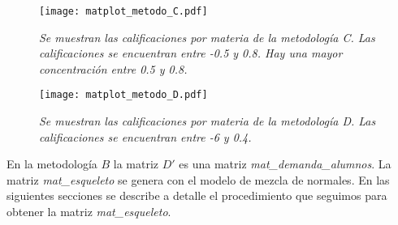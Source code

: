                                                                                                                                                                                                                                                                                                                                                                                                                                                                                   
\begin{figure}[H]
\centering
\texttt{[image: matplot\_metodo\_C.pdf]} %
\caption[\textit{Calificaciones metodología C}]{\textit{Se muestran las calificaciones por materia de la metodología C. Las calificaciones se encuentran entre -0.5 y 0.8. Hay una mayor concentración entre 0.5 y 0.8.}}\label{fig_metodo_C}
\end{figure}                                                                                                                                                                                                                                                                                                                                                                                                                                                                                  

\begin{figure}[H]
\centering
\texttt{[image: matplot\_metodo\_D.pdf]} %
\caption[\textit{Calificaciones metodología D}]{\textit{Se muestran las calificaciones por materia de la metodología D. Las calificaciones se encuentran entre -6 y 0.4.}}\label{fig_metodo_D}
\end{figure}
                                                                                                                                                                                                                                                                                                                                                                                                                                                                                  
                                                                                                                                                                                                                                                                                                                                                                                                                                                                                  En la metodología $B$ la matriz $D'$ es una matriz \textit{mat\_demanda\_alumnos}. La matriz \textit{mat\_esqueleto} se genera con el modelo de mezcla de normales. En las siguientes secciones se describe a detalle el procedimiento que seguimos para obtener la matriz \textit{mat\_esqueleto}. %

